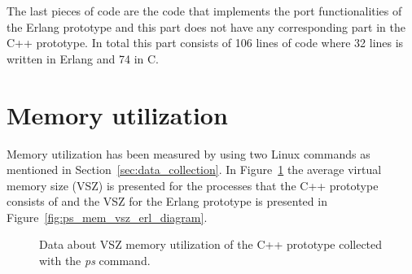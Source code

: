 The last pieces of code are the code that implements the port functionalities of the Erlang prototype and this part does not have any corresponding part in the C++ prototype. In total this part consists of 106 lines of code where 32 lines is written in Erlang and 74 in C. 

\section{Memory utilization}
Memory utilization has been measured by using two Linux commands as mentioned in Section~\ref{sec:data_collection}. In Figure~\ref{fig:ps_mem_vsz_diagram} the average virtual memory size (VSZ) is presented for the processes that the C++ prototype consists of and the VSZ for the Erlang prototype is presented in Figure~\ref{fig:ps_mem_vsz_erl_diagram}.  

\begin{figure}[H]
    \centering
    \caption{Data about VSZ memory utilization of the C++ prototype collected with the \textit{ps} command.}
    \label{fig:ps_mem_vsz_diagram}
\end{figure}

